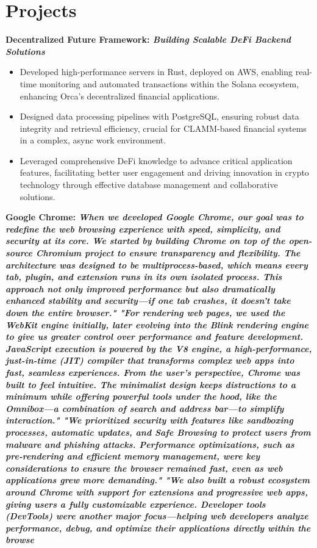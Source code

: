 \documentclass[a4paper,10pt]{article}
\begin{document}
\section*{Projects}
\vspace{-3pt}
\textbf{Decentralized Future Framework: \textit{Building Scalable DeFi Backend Solutions}}
\begin{itemize}
    \item Developed high-performance servers in Rust, deployed on AWS, enabling real-time monitoring and automated transactions within the Solana ecosystem, enhancing Orca's decentralized financial applications.
\item Designed data processing pipelines with PostgreSQL, ensuring robust data integrity and retrieval efficiency, crucial for CLAMM-based financial systems in a complex, async work environment.
\item Leveraged comprehensive DeFi knowledge to advance critical application features, facilitating better user engagement and driving innovation in crypto technology through effective database management and collaborative solutions.
\end{itemize}
\vspace{0pt}
\textbf{Google Chrome: \textit{When we developed Google Chrome, our goal was to redefine the web browsing experience with speed, simplicity, and security at its core. We started by building Chrome on top of the open-source Chromium project to ensure transparency and flexibility. The architecture was designed to be multiprocess-based, which means every tab, plugin, and extension runs in its own isolated process. This approach not only improved performance but also dramatically enhanced stability and security—if one tab crashes, it doesn't take down the entire browser." "For rendering web pages, we used the WebKit engine initially, later evolving into the Blink rendering engine to give us greater control over performance and feature development. JavaScript execution is powered by the V8 engine, a high-performance, just-in-time (JIT) compiler that transforms complex web apps into fast, seamless experiences. From the user’s perspective, Chrome was built to feel intuitive. The minimalist design keeps distractions to a minimum while offering powerful tools under the hood, like the Omnibox—a combination of search and address bar—to simplify interaction." "We prioritized security with features like sandboxing processes, automatic updates, and Safe Browsing to protect users from malware and phishing attacks. Performance optimizations, such as pre-rendering and efficient memory management, were key considerations to ensure the browser remained fast, even as web applications grew more demanding." "We also built a robust ecosystem around Chrome with support for extensions and progressive web apps, giving users a fully customizable experience. Developer tools (DevTools) were another major focus—helping web developers analyze performance, debug, and optimize their applications directly within the browse}}
\end{document}
